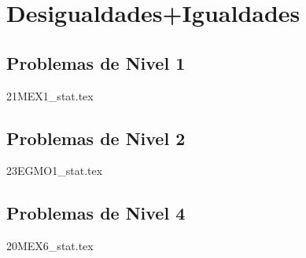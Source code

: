 \section{Desigualdades+Igualdades}
\subsection{Problemas de Nivel 1}
{21MEX1_stat.tex} %

\subsection{Problemas de Nivel 2}
{23EGMO1_stat.tex} %

\subsection{Problemas de Nivel 4}
{20MEX6_stat.tex} %